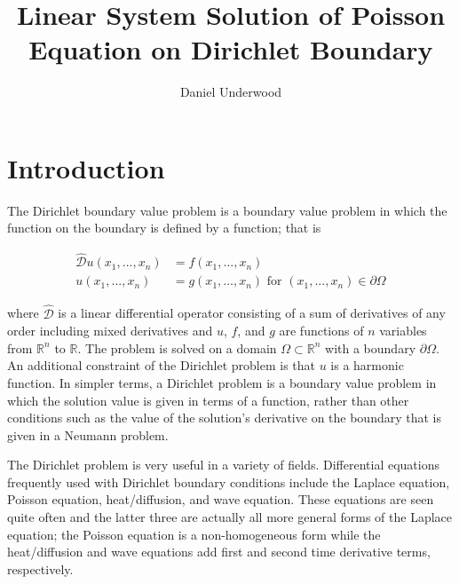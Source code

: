 \documentclass[10pt,a4paper]{article}
\author{Daniel Underwood}
\title{Linear System Solution of Poisson Equation on Dirichlet Boundary}
\begin{document}
\maketitle


\section*{Introduction}
The Dirichlet boundary value problem is a boundary value problem in which the function on the boundary is defined by a function; that is

\begin{subequations}
  \begin{align}
  \hat{\mathcal{D}} u(x_1 , ... , x_n) &= f(x_1 , ... , x_n) \label{eqn: dirichlet 1}\\
  u(x_1, ..., x_n) &= g(x_1, ..., x_n) \,\, \text{for} \,\, (x_1, ..., x_n) \in \partial\Omega \label{eqn: dirichlet 2}
  \end{align}
\end{subequations}

where $\hat{\mathcal{D}}$ is a linear differential operator consisting of a sum of derivatives of any order including mixed derivatives and $u$, $f$, and $g$ are functions of $n$ variables from $\mathbb{R}^n$ to $\mathbb{R}$. The problem is solved on a domain $\Omega \subset \mathbb{R}^n$ with a boundary $\partial \Omega$. An additional constraint of the Dirichlet problem is that $u$ is a harmonic function. In simpler terms, a Dirichlet problem is a boundary value problem in which the solution value is given in terms of a function, rather than other conditions such as the value of the solution's derivative on the boundary that is given in a Neumann problem.

The Dirichlet problem is very useful in a variety of fields. Differential equations frequently used with Dirichlet boundary conditions include the  Laplace equation, Poisson equation, heat/diffusion, and wave equation. These equations are seen quite often and the latter three are actually all more general forms of the Laplace equation; the Poisson equation is a non-homogeneous form while the heat/diffusion and wave equations add first and second time derivative terms, respectively.
\end{document}
